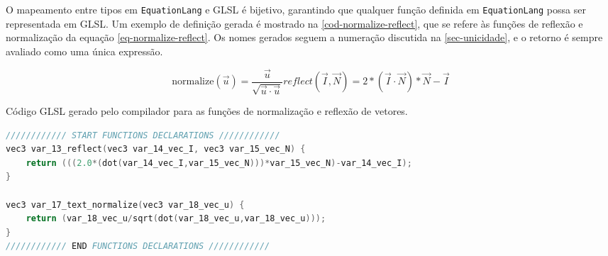 O mapeamento entre tipos em \texttt{EquationLang} e GLSL é bijetivo, garantindo que qualquer função definida em \texttt{EquationLang} possa ser representada em GLSL. Um exemplo de definição gerada é mostrado na \autoref{cod-normalize-reflect}, que se refere às funções de reflexão e normalização da equação \autoref{eq-normalize-reflect}. Os nomes gerados seguem a numeração discutida na \autoref{sec-unicidade}, e o retorno é sempre avaliado como uma única expressão.


\label{eq-normalize-reflect} \begin{subequations}
\begin{equation}
  \text{normalize}(\vec{u}) = \frac{\vec{u}}{\sqrt{\vec{u} \cdot \vec{u}}}
\end{equation}

\begin{equation}
reflect(\vec I, \vec N) =  2*(\vec I \cdot \vec N)*\vec N - \vec I
\end{equation}
\end{subequations}

\begin{codigo}[H]
   \caption{\small Código GLSL gerado pelo compilador para as funções de normalização e reflexão de vetores. }
   \label{cod-normalize-reflect}
\begin{lstlisting}[language=C, inputencoding=utf8]
//////////// START FUNCTIONS DECLARATIONS ////////////
vec3 var_13_reflect(vec3 var_14_vec_I, vec3 var_15_vec_N) {
    return (((2.0*(dot(var_14_vec_I,var_15_vec_N)))*var_15_vec_N)-var_14_vec_I);
}

vec3 var_17_text_normalize(vec3 var_18_vec_u) {
    return (var_18_vec_u/sqrt(dot(var_18_vec_u,var_18_vec_u)));
}
//////////// END FUNCTIONS DECLARATIONS ////////////

\end{lstlisting}
\end{codigo}
